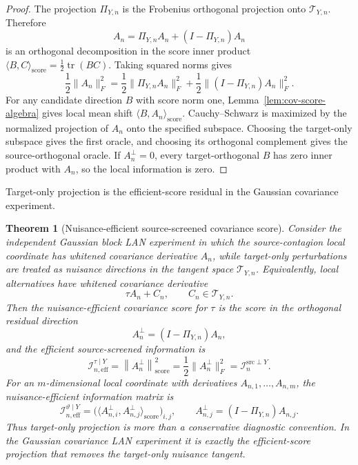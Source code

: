 \documentclass[11pt,a4paper]{amsart}
\theoremstyle{plain}
\newtheorem{theorem}{Theorem}[section]
\theoremstyle{definition}
\theoremstyle{remark}
\DeclareMathOperator{\tr}{tr}
\newcommand{\scrT}{\mathcal{T}}
\newcommand{\scrI}{\mathcal{I}}
\begin{document}
\begin{proof}
The projection \(\Pi_{Y,n}\) is the Frobenius orthogonal projection onto \(\scrT_{Y,n}\).  Therefore
\[
        A_n=\Pi_{Y,n}A_n+(I-\Pi_{Y,n})A_n
\]
is an orthogonal decomposition in the score inner product
\(\langle B,C\rangle_{\mathrm{score}}=\frac12\tr(BC)\).  Taking squared norms gives
\[
        \frac12\|A_n\|_F^2
        =
        \frac12\|\Pi_{Y,n}A_n\|_F^2
        +
        \frac12\|(I-\Pi_{Y,n})A_n\|_F^2.
\]
For any candidate direction \(B\) with score norm one, Lemma~\ref{lem:cov-score-algebra} gives
local mean shift \(\langle B,A_n\rangle_{\mathrm{score}}\).  Cauchy--Schwarz is maximized by the
normalized projection of \(A_n\) onto the specified subspace.  Choosing the target-only subspace gives
the first oracle, and choosing its orthogonal complement gives the source-orthogonal oracle.  If
\(A_n^\perp=0\), every target-orthogonal \(B\) has zero inner product with \(A_n\), so the local
information is zero.
\end{proof}

Target-only projection is the efficient-score residual in the Gaussian covariance experiment.

\begin{theorem}[Nuisance-efficient source-screened covariance score]\label{thm:nuisance-efficient-score}
Consider the independent Gaussian block LAN experiment in which the source-contagion local
coordinate has whitened covariance derivative \(A_n\), while target-only perturbations are treated
as nuisance directions in the tangent space \(\scrT_{Y,n}\).  Equivalently, local alternatives have
whitened covariance derivative
\[
        \tau A_n+C_n,
        \qquad
        C_n\in\scrT_{Y,n}.
\]
Then the nuisance-efficient covariance score for \(\tau\) is the score in the orthogonal residual
direction
\[
        A_n^\perp=(I-\Pi_{Y,n})A_n,
\]
and the efficient source-screened information is
\[
        \scrI_{n,\mathrm{eff}}^{\tau\mid Y}
        =
        \left\|A_n^\perp\right\|_{\mathrm{score}}^2
        =
        \frac12\|A_n^\perp\|_F^2
        =
        \scrI_n^{\mathrm{src}\perp Y}.
\]
For an \(m\)-dimensional local coordinate with derivatives
\(A_{n,1},\dots,A_{n,m}\), the nuisance-efficient information matrix is
\[
        \scrI_{n,\mathrm{eff}}^{\vartheta\mid Y}
        =
        \bigl(
        \langle A_{n,i}^\perp,A_{n,j}^\perp\rangle_{\mathrm{score}}
        \bigr)_{i,j},
        \qquad
        A_{n,j}^\perp=(I-\Pi_{Y,n})A_{n,j}.
\]
Thus target-only projection is more than a conservative diagnostic convention.  In the Gaussian
covariance LAN experiment it is exactly the efficient-score projection that removes the target-only
nuisance tangent.
\end{theorem}
\end{document}
